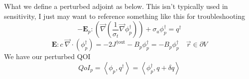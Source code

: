 \documentclass{article}
\newcommand{\vr}{\vec{r}}
\newcommand{\bra}{\left\langle}
\newcommand{\ket}{\right\rangle}
\newcommand{\vgrad}{\vec{\nabla}}
\newcommand{\bound}{\partial V}
\newcommand{\Edd}{\mathbf{E}}
\newcommand{\sigt}{\sigma_t}
\newcommand{\siga}{\sigma_a}
\newcommand{\isigt}{c}
\newcommand{\scalSource}{q}
\newcommand{\scalResp}{q^\dag}
\newcommand{\qoi}{QoI}
\begin{document}
What we define a perturbed adjoint as below. This isn't typically used in sensitivity, I just may want to reference something like this for troubleshooting
\begin{equation}
- \Edd_p : \left( \vgrad \left( \frac{1}{\sigt}\vgrad \phi^\dag_p \right) \right) + \siga \phi^\dag_p = \scalResp
\end{equation}
\begin{equation}
\Edd : \isigt \ \vec{\nabla} \cdot \left( \phi^\dag_p \right)  = - 2J^{\dag \text{out}} - B_p \phi^\dag_p =  - B_p \phi^\dag_p \quad \vr \in \bound
\end{equation}
We have our perturbed QOI
\begin{equation}
\qoi_p=\bra \phi_p , \scalResp \ket = \bra \phi^\dag_p , \scalSource +\delta \scalSource \ket 
\end{equation}
\end{document}

